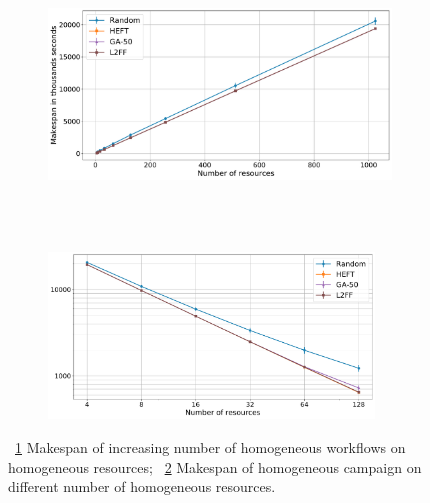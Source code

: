 \begin{figure}[ht!]
    \centering
    \begin{subfigure}[b]{0.85\textwidth}
        \includegraphics[width=.95\textwidth]{figures/campaign/StHeteroCampaigns_4DynHomoResources.pdf}
        \caption{}
        \label{fig:StHeteroCampaigns_4DynHomoResources}
    \end{subfigure}\\
    ~ 
    \begin{subfigure}[b]{0.85\textwidth}
        \includegraphics[width=0.95\textwidth]{figures/campaign/DynHomoResources_StHeteroCampaigns.pdf}
        \caption{}
        \label{fig:DynHomoResources_StHeteroCampaigns}
    \end{subfigure}
    \caption{~\ref{fig:StHeteroCampaigns_4DynHomoResources} Makespan of increasing number of homogeneous workflows on homogeneous resources;
        ~\ref{fig:DynHomoResources_StHeteroCampaigns} Makespan of homogeneous campaign on different number of homogeneous resources.}
    \label{fig:dyn_hetero_homog_analysis}
\end{figure}

